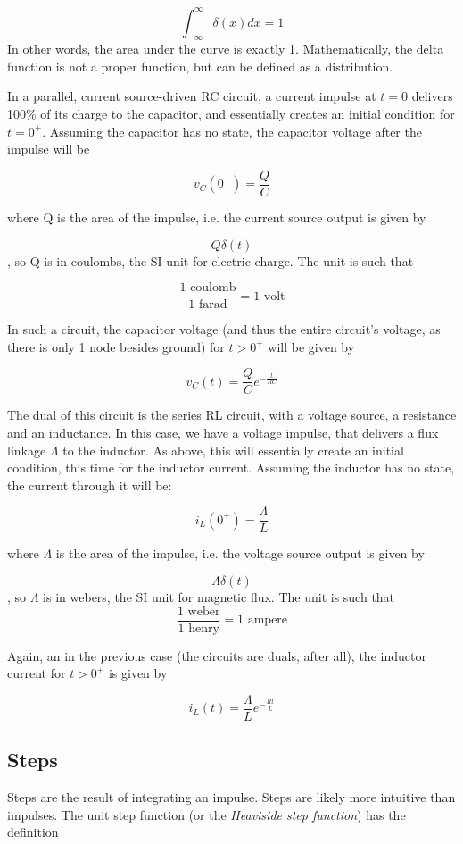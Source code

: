 \documentclass[12pt,a4paper]{report}
\begin{document}
\[ \int_{-\infty}^{\infty} \delta(x) dx = 1 \]
In other words, the area under the curve is exactly 1. Mathematically, the delta function is not a proper function, but can be defined as a distribution.

In a parallel, current source-driven RC circuit, a current impulse at $t = 0$ delivers 100\% of its charge to the capacitor, and essentially creates an initial condition for $t = 0^{+}$. Assuming the capacitor has no state, the capacitor voltage after the impulse will be 

\[ v_C(0^{+}) = \frac{Q}{C} \]

where Q is the area of the impulse, i.e. the current source output is given by

\[ Q \delta(t) \], so Q is in coulombs, the SI unit for electric charge. The unit is such that

\[ \frac{1\text{ coulomb}}{1\text{ farad}} = 1\text{ volt} \]

In such a circuit, the capacitor voltage (and thus the entire circuit's voltage, as there is only 1 node besides ground) for $t > 0^{+}$ will be given by

\[ v_C(t) = \frac{Q}{C} e^{-\frac{t}{RC}} \]

The dual of this circuit is the series RL circuit, with a voltage source, a resistance and an inductance. In this case, we have a voltage impulse, that delivers a flux linkage $\Lambda$ to the inductor. As above, this will essentially create an initial condition, this time for the inductor current. Assuming the inductor has no state, the current through it will be:

\[ i_L(0^{+}) = \frac{\Lambda}{L} \]

where $\Lambda$ is the area of the impulse, i.e. the voltage source output is given by

\[ \Lambda \delta(t) \], so $\Lambda$ is in webers, the SI unit for magnetic flux. The unit is such that
\[ \frac{1\text{ weber}}{1\text{ henry}} = 1\text{ ampere} \]

Again, an in the previous case (the circuits are duals, after all), the inductor current for $t > 0^{+}$ is given by

\[ i_L(t) = \frac{\Lambda}{L} e^{-\frac{R t}{L}} \] 

\subsection{Steps}
Steps are the result of integrating an impulse. Steps are likely more intuitive than impulses. The unit step function (or the \emph{Heaviside step function}) has the definition
\end{document}
